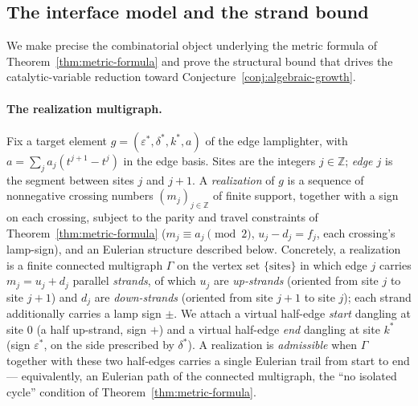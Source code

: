 %

\subsection{The interface model and the strand bound}
\label{ssec:strand-bound}

We make precise the combinatorial object underlying the metric formula of
Theorem~\ref{thm:metric-formula} and prove the structural bound that drives
the catalytic-variable reduction toward
Conjecture~\ref{conj:algebraic-growth}.

\paragraph{The realization multigraph.}
Fix a target element $g=(\varepsilon^*,\delta^*,k^*,a)$ of the edge
lamplighter, with $a=\sum_j a_j(t^{j+1}-t^j)$ in the edge basis.  Sites are
the integers $j\in\mathbb Z$; \emph{edge $j$} is the segment between sites
$j$ and $j+1$.  A \emph{realization} of $g$ is a sequence of nonnegative
crossing numbers $(m_j)_{j\in\mathbb Z}$ of finite support, together with a
sign on each crossing, subject to the parity and travel constraints of
Theorem~\ref{thm:metric-formula} ($m_j\equiv a_j\pmod 2$, $u_j-d_j=f_j$,
each crossing's lamp-sign), and an Eulerian structure described below.
Concretely, a realization is a finite connected multigraph
$\Gamma$ on the vertex set $\{\text{sites}\}$ in which edge $j$ carries
$m_j=u_j+d_j$ parallel \emph{strands}, of which $u_j$ are \emph{up-strands}
(oriented from site $j$ to site $j+1$) and $d_j$ are \emph{down-strands}
(oriented from site $j+1$ to site $j$); each strand additionally carries a
lamp sign $\pm$.  We attach a virtual half-edge \emph{start} dangling at
site $0$ (a half up-strand, sign $+$) and a virtual half-edge \emph{end}
dangling at site $k^*$ (sign $\varepsilon^*$, on the side prescribed by
$\delta^*$).  A realization is \emph{admissible} when $\Gamma$ together with
these two half-edges carries a single Eulerian trail from start to end ---
equivalently, an Eulerian path of the connected multigraph, the
``no isolated cycle'' condition of Theorem~\ref{thm:metric-formula}.

